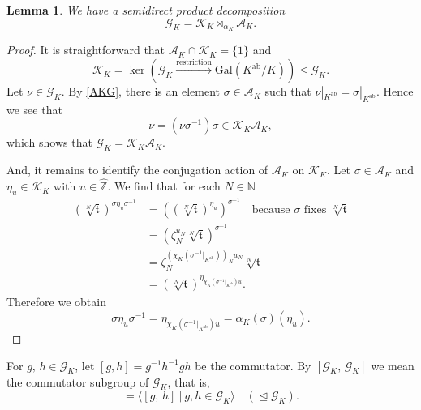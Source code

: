 \documentclass[reqno,11pt]{article}
\theoremstyle{plain} %
\newtheorem{lemma}[theorem]{\indent\sc Lemma}
\theoremstyle{definition} %
\begin{document}
\begin{lemma}\label{decomposition}
We have a semidirect product decomposition
\begin{equation*}
\mathcal{G}_K=\mathcal{K}_K\rtimes_{\alpha_K}\mathcal{A}_K.
\end{equation*}
\end{lemma}
\begin{proof}
It is straightforward that
$\mathcal{A}_K\cap\mathcal{K}_K=\{1\}$ and
\begin{equation*}
\mathcal{K}_K=
\ker\left(
\mathcal{G}_K\stackrel{\mathrm{restriction}}{\longrightarrow}
\mathrm{Gal}(K^\mathrm{ab}/K)
\right)\trianglelefteq \mathcal{G}_K.
\end{equation*}
Let $\nu\in \mathcal{G}_K$. By \eqref{AKG}, there is an element
$\sigma\in\mathcal{A}_K$ such that
$\nu|_{K^\mathrm{ab}}=\sigma|_{K^\mathrm{ab}}$. Hence
we see that
\begin{equation*}
\nu=(\nu\sigma^{-1})\sigma\in\mathcal{K}_K\mathcal{A}_K,
\end{equation*}
which shows that $\mathcal{G}_K=\mathcal{K}_K\mathcal{A}_K$.
\par
And, it remains to identify the conjugation action of $\mathcal{A}_K$ on $\mathcal{K}_K$. 
Let $\sigma\in\mathcal{A}_K$ and $\eta_u\in\mathcal{K}_K$ with $u\in\widehat{\mathbb{Z}}$. 
We find that for each $N\in\mathbb{N}$
\begin{align*}
\left(\sqrt[N]{\mathfrak{t}}\right)^{\sigma\eta_u\sigma^{-1}}
&=\left(\left(\sqrt[N]{\mathfrak{t}}\right)^{\eta_u}\right)^{\sigma^{-1}}
\quad\textrm{because $\sigma$ fixes $\sqrt[N]{\mathfrak{t}}$}\\
&=\left(\zeta_N^{u_N}\sqrt[N]{\mathfrak{t}}\right)^{\sigma^{-1}}\\
&=\zeta_N^{\left(\chi_K(\sigma^{-1}|_{K^\mathrm{ab}})\right)_Nu_N}
\sqrt[N]{\mathfrak{t}}\\
&=\left(\sqrt[N]{\mathfrak{t}}\right)^{
\eta_{\chi_K(\sigma^{-1}|_{K^\mathrm{ab}})u}}.
\end{align*}
Therefore we obtain
\begin{equation*}
\sigma\eta_u\sigma^{-1}
=\eta_{\chi_K(\sigma^{-1}|_{K^\mathrm{ab}})u}=\alpha_K(\sigma)(\eta_u).
\end{equation*}
\end{proof}

For $g,\,h\in \mathcal{G}_K$, let
$[g,h]=g^{-1}h^{-1}gh$ be the commutator. By $[\mathcal{G}_K,\,\mathcal{G}_K]$ 
we mean the commutator subgroup of $\mathcal{G}_K$, that is,
\begin{equation*}
[\mathcal{G}_K,\mathcal{G}_K]=\langle[g,\,h]~|~g,h\in \mathcal{G}_K\rangle
\quad(\trianglelefteq \mathcal{G}_K). 
\end{equation*}
\end{document}
